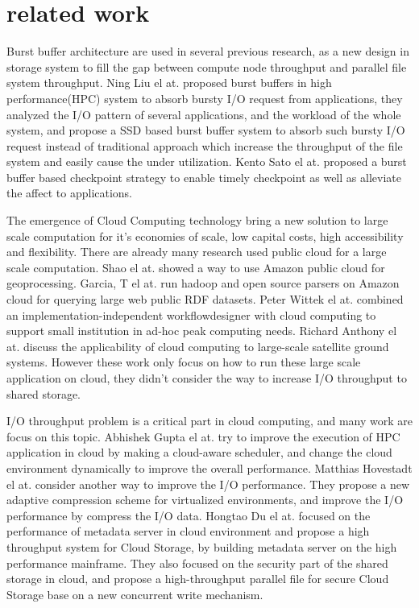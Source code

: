 \section{related work}
\label{sec:related work}

Burst buffer architecture are used in several previous research, as a new design in storage system
to fill the gap between compute node throughput and parallel file system throughput.
Ning Liu el at. \cite{on_the_role_of_burst_buffers} proposed burst buffers in high
performance(HPC) system to absorb bursty I/O request from applications, they analyzed the I/O
pattern of several applications, and the workload of the whole system, and propose a SSD based burst
buffer system to absorb such bursty I/O request instead of traditional approach which increase the
throughput of the file system and easily cause the under utilization.
Kento Sato el at.\cite{checkpointing} proposed a burst buffer based checkpoint strategy to enable
timely checkpoint as well as alleviate the affect to applications.

The emergence of Cloud Computing technology bring a new solution to large scale computation for it's
economies of scale, low capital costs, high accessibility and flexibility.
There are already many research used public cloud for a large scale computation.
Shao el at.\cite{Geoprocessing_on_the_Amazon_cloud_computing_platform} showed a way to use Amazon
public cloud for geoprocessing.
Garcia, T el at.\cite{Analysis_of_Big_Data_Technologies_and_Method} run hadoop and open source
parsers on Amazon cloud for querying large web public RDF datasets.
Peter Wittek el at.\cite{XML_Processing_in_the_Cloud} combined an implementation-independent
workflowdesigner with cloud computing to support small institution in ad-hoc peak computing needs.
Richard Anthony el at.\cite{Cloud_computing_applications_for_large-scale_satellite_ground_systems}
discuss the applicability of cloud computing to large-scale satellite ground 
systems.
However these work only focus on how to run these large scale application on cloud, they didn't
consider the way to increase I/O throughput to shared storage.

I/O throughput problem is a critical part in cloud computing, and many work are focus on this
topic.
Abhishek Gupta el at.\cite{Towards_Efficient_Mapping} try to improve the execution of HPC
application in cloud by making a cloud-aware scheduler, and change the cloud environment
dynamically to improve the overall performance.
Matthias Hovestadt el at.\cite{Evaluating_Adaptive_Compression} consider another way to improve the
I/O performance.
They propose a new adaptive compression scheme for virtualized environments, and improve the I/O
performance by compress the I/O data.
Hongtao Du el at.\cite{DHFS:_A_High-Throughput_Heterogeneous_File_System_Based_on_Mainframe_for_Cloud_Storage}
focused on the performance of metadata server in cloud environment and propose a high throughput
system for Cloud Storage, by building metadata server on the high performance mainframe.
They also focused on the security part of the shared storage in cloud, and propose a
high-throughput parallel file for secure Cloud Storage base on a new concurrent write
mechanism\cite{PsFS:_A_high-throughput_parallel_file_system_for_secure_Cloud_Storage_system}.
